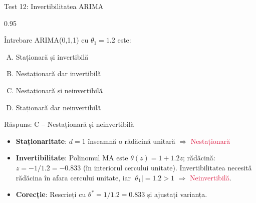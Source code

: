 \documentclass[9pt, aspectratio=169, t]{beamer}
\begin{document}
\begin{frame}{Test 12: Invertibilitatea ARIMA}
    \begin{cminipage}{0.95\textwidth}
    \begin{alertblock}{Întrebare}
        ARIMA(0,1,1) cu $\theta_1 = 1.2$ este:
    \end{alertblock}

    \vspace{0.2cm}

    \begin{enumerate}[A)]\setlength{\itemsep}{0pt}
        \item Staționară și invertibilă
        \item Nestaționară dar invertibilă
        \item Nestaționară și neinvertibilă
        \item Staționară dar neinvertibilă
    \end{enumerate}

    \vspace{0.3cm}
    \pause
    \begin{exampleblock}{Răspuns: C -- Nestaționară și neinvertibilă}
        \begin{itemize}\setlength{\itemsep}{0pt}
        \item \textbf{Staționaritate}: $d=1$ înseamnă o rădăcină unitară $\Rightarrow$ \textcolor{Crimson}{Nestaționară}
        \item \textbf{Invertibilitate}: Polinomul MA este $\theta(z) = 1 + 1.2z$; rădăcină: $z = -1/1.2 = -0.833$ (în interiorul cercului unitate). Invertibilitatea necesită rădăcina în afara cercului unitate, iar $|\theta_1| = 1.2 > 1$ $\Rightarrow$ \textcolor{Crimson}{Neinvertibilă}.
        \item \textbf{Corecție}: Rescrieți cu $\theta^* = 1/1.2 = 0.833$ și ajustați varianța.
        \end{itemize}
    \end{exampleblock}
    \end{cminipage}
\end{frame}
\end{document}
